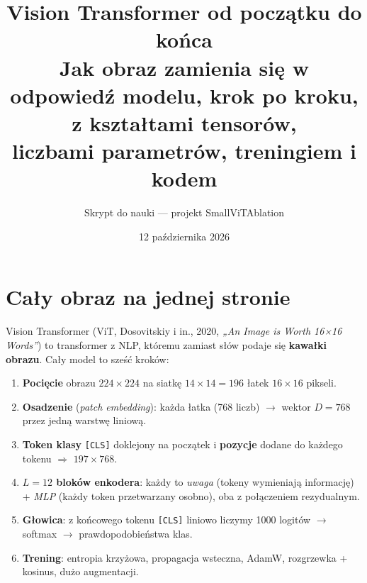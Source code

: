 \documentclass[11pt,a4paper]{article}
\title{\textbf{Vision Transformer od początku do końca}\\[2mm]
\large Jak obraz zamienia się w odpowiedź modelu, krok po kroku, z kształtami tensorów,\\ liczbami parametrów, treningiem i kodem}
\author{Skrypt do nauki — projekt SmallViTAblation}
\date{12 października 2026}
\begin{document}
\maketitle
\tableofcontents
\newpage

\section{Cały obraz na jednej stronie}

Vision Transformer (ViT, Dosovitskiy i in., 2020, \emph{„An Image is Worth 16×16 Words''}) to
transformer z NLP, któremu zamiast słów podaje się \textbf{kawałki obrazu}. Cały model to sześć
kroków:

\begin{enumerate}[leftmargin=*,itemsep=2pt]
  \item \textbf{Pocięcie} obrazu $224\times224$ na siatkę $14\times14 = 196$ łatek $16\times16$ pikseli.
  \item \textbf{Osadzenie} (\emph{patch embedding}): każda łatka (768 liczb) $\to$ wektor $D=768$ przez jedną warstwę liniową.
  \item \textbf{Token klasy} \texttt{[CLS]} doklejony na początek i \textbf{pozycje} dodane do każdego tokenu $\Rightarrow$ $197\times768$.
  \item \textbf{$L=12$ bloków enkodera}: każdy to \emph{uwaga} (tokeny wymieniają informację) + \emph{MLP} (każdy token przetwarzany osobno), oba z połączeniem rezydualnym.
  \item \textbf{Głowica}: z końcowego tokenu \texttt{[CLS]} liniowo liczymy 1000 logitów $\to$ softmax $\to$ prawdopodobieństwa klas.
  \item \textbf{Trening}: entropia krzyżowa, propagacja wsteczna, AdamW, rozgrzewka + kosinus, dużo augmentacji.
\end{enumerate}
\end{document}
